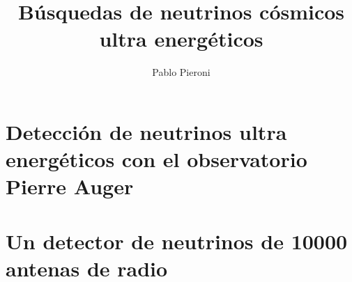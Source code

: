 \documentclass[a4paper,12pt]{book}
\title{Búsquedas de neutrinos cósmicos ultra energéticos}
\author{Pablo Pieroni}
\begin{document}
\renewcommand{\listtablename}{Índice de tablas}
\renewcommand{\tablename}{Tabla} 




\newpage
\thispagestyle{empty}
% 
% 

\maketitle
% 
% 
\tableofcontents
% 
% 

\part{Detecci\'on de neutrinos ultra energ\'eticos con el observatorio Pierre Auger}






\part{Un detector de neutrinos de 10000 antenas de radio}







\appendix



\end{document}
